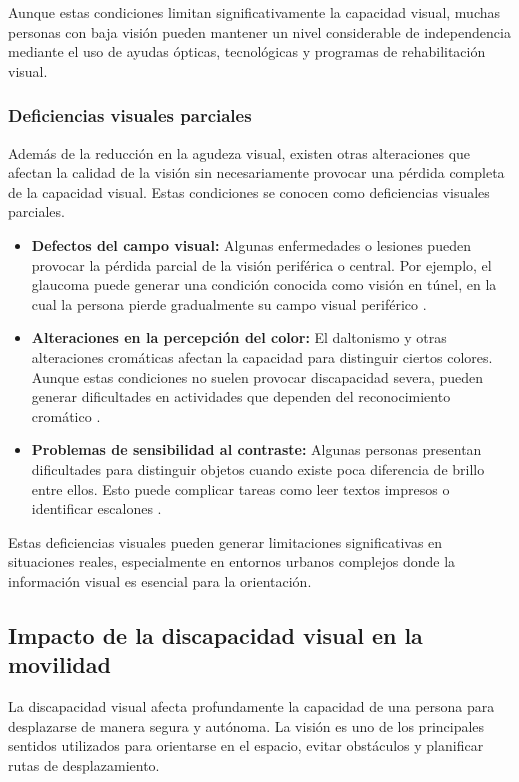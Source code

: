 Aunque estas condiciones limitan significativamente la capacidad visual, muchas personas con baja visión pueden mantener un nivel considerable de independencia mediante el uso de ayudas ópticas, tecnológicas y programas de rehabilitación visual.

\subsubsection{Deficiencias visuales parciales}
Además de la reducción en la agudeza visual, existen otras alteraciones que afectan la calidad de la visión sin necesariamente provocar una pérdida completa de la capacidad visual. Estas condiciones se conocen como deficiencias visuales parciales.
\begin{itemize}
    \item \textbf{Defectos del campo visual:} Algunas enfermedades o lesiones pueden provocar la pérdida parcial de la visión periférica o central. Por ejemplo, el glaucoma puede generar una condición conocida como visión en túnel, en la cual la persona pierde gradualmente su campo visual periférico \cite{who_blindness2026}.
    \item \textbf{Alteraciones en la percepción del color:} El daltonismo y otras alteraciones cromáticas afectan la capacidad para distinguir ciertos colores. Aunque estas condiciones no suelen provocar discapacidad severa, pueden generar dificultades en actividades que dependen del reconocimiento cromático \cite{once_bajavision}.
    \item  \textbf{Problemas de sensibilidad al contraste:} Algunas personas presentan dificultades para distinguir objetos cuando existe poca diferencia de brillo entre ellos. Esto puede complicar tareas como leer textos impresos o identificar escalones \cite{once_bajavision}.
\end{itemize}
Estas deficiencias visuales pueden generar limitaciones significativas en situaciones reales, especialmente en entornos urbanos complejos donde la información visual es esencial para la orientación.

\subsection{Impacto de la discapacidad visual en la movilidad}
La discapacidad visual afecta profundamente la capacidad de una persona para desplazarse de manera segura y autónoma. La visión es uno de los principales sentidos utilizados para orientarse en el espacio, evitar obstáculos y planificar rutas de desplazamiento.

